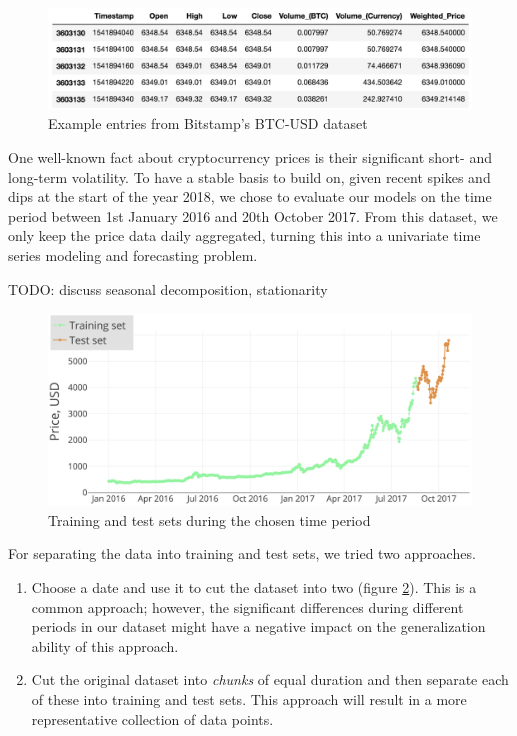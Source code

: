 \documentclass{article}
\begin{document}
\begin{figure}[h!]
\centering
\includegraphics[width=0.9\columnwidth]{images/bitstamp-dataset.png}
\caption{Example entries from Bitstamp's BTC-USD dataset}
\label{fig:bitstamp-dataset}
\end{figure}

One well-known fact about cryptocurrency prices is their significant short- and long-term volatility. To have a stable basis to build on, given recent spikes and dips at the start of the year 2018, we chose to evaluate our models on the time period between 1st January 2016 and 20th October 2017. From this dataset, we only keep the price data daily aggregated, turning this into a univariate time series modeling and forecasting problem.

TODO: discuss seasonal decomposition, stationarity

\begin{figure}[h!]
\centering
\includegraphics[width=0.9\columnwidth]{images/dataset.png}
\caption{Training and test sets during the chosen time period}
\label{fig:dataset}
\end{figure}

For separating the data into training and test sets, we tried two approaches.

\begin{enumerate}
    \item Choose a date and use it to cut the dataset into two (figure \ref{fig:dataset}). This is a common approach; however, the significant differences during different periods in our dataset might have a negative impact on the generalization ability of this approach.
    \item Cut the original dataset into \emph{chunks} of equal duration and then separate each of these into training and test sets. This approach will result in a more representative collection of data points. 
\end{enumerate}
\end{document}
